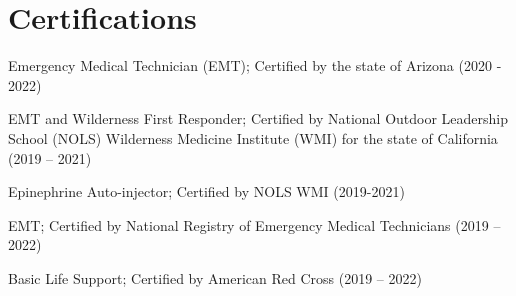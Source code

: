 \section{\mysidestyle Certifications}
\begin{list2}
\item Emergency Medical Technician (EMT); Certified by the state of Arizona (2020 - 2022)
\item EMT and Wilderness First Responder; Certified by National Outdoor Leadership School (NOLS) Wilderness Medicine Institute (WMI) for the state of California (2019 – 2021)
\item Epinephrine Auto-injector; Certified by NOLS WMI (2019-2021)
\item EMT; Certified by National Registry of Emergency Medical Technicians (2019 – 2022)
\item Basic Life Support; Certified by American Red Cross (2019 – 2022)
\end{list2}